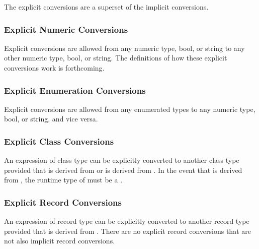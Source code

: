The explicit conversions are a superset of the implicit conversions.

\subsubsection{Explicit Numeric Conversions}
\label{Explicit_Numeric_Conversions}

Explicit conversions are allowed from any numeric type, bool, or
string to any other numeric type, bool, or string.  The definitions of
how these explicit conversions work is forthcoming.

\subsubsection{Explicit Enumeration Conversions}
\label{Explicit_Enumeration_Conversions}

Explicit conversions are allowed from any enumerated types to any
numeric type, bool, or string, and vice versa.

\subsubsection{Explicit Class Conversions}
\label{Explicit_Class_Conversions}

An expression of class type  can be explicitly converted to
another class type  provided that  is derived
from  or  is derived from .  In the event
that  is derived from , the runtime type of 
must be a .

\subsubsection{Explicit Record Conversions}
\label{Explicit_Record_Conversions}

An expression of record type  can be explicitly converted to
another record type  provided that  is derived
from .  There are no explicit record conversions that are not
also implicit record conversions.
